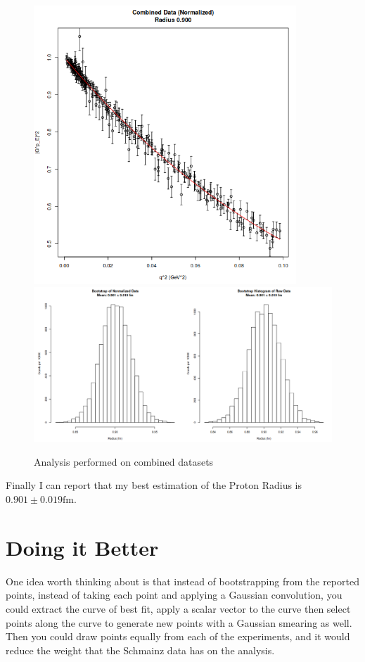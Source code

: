 \documentclass[12pt]{article}
\begin{document}
\begin{figure}[!htb]
  \centering
  \includegraphics[width=280pt]{combined_data.png}
  \includegraphics[width=400pt]{hist_data.png}
  \caption{Analysis performed on combined datasets}
\end{figure}

Finally I can report that my best estimation of the Proton Radius is $0.901 \pm 0.019 \mbox{fm}$.


\section{Doing it Better}

One idea worth thinking about is that instead of bootstrapping from the reported points, instead of taking each point and applying a Gaussian convolution, you could extract the curve of best fit, apply a scalar vector to the curve then select points along the curve to generate new points with a Gaussian smearing as well. Then you could draw points equally from each of the experiments, and it would reduce the weight that the Schmainz data has on the analysis.
\end{document}
